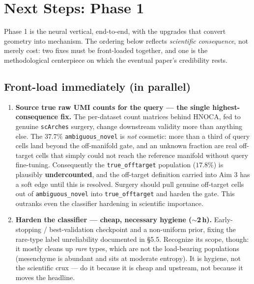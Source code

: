 \documentclass[11pt]{article}
\begin{document}
\section{Next Steps: Phase 1}
Phase 1 is the neural vertical, end-to-end, with the upgrades that convert geometry into mechanism. The ordering below reflects \emph{scientific consequence}, not merely cost: two fixes must be front-loaded together, and one is the methodological centerpiece on which the eventual paper's credibility rests.

\subsection*{Front-load immediately (in parallel)}
\begin{enumerate}[label=\textbf{\arabic*.}]
\item \textbf{Source true raw UMI counts for the query --- the single highest-consequence fix.} The per-dataset count matrices behind HNOCA, fed to genuine \texttt{scArches} surgery, change downstream validity more than anything else. The $37.7\%$ \texttt{ambiguous\_novel} is \emph{not} cosmetic: more than a third of query cells land beyond the off-manifold gate, and an unknown fraction are real off-target cells that simply could not reach the reference manifold without query fine-tuning. Consequently the \texttt{true\_offtarget} population ($17.8\%$) is plausibly \textbf{undercounted}, and the off-target definition carried into Aim 3 has a soft edge until this is resolved. Surgery should pull genuine off-target cells out of \texttt{ambiguous\_novel} into \texttt{true\_offtarget} and harden the gate. This outranks even the classifier hardening in scientific importance.
\item \textbf{Harden the classifier --- cheap, necessary hygiene ($\sim$2\,h).} Early-stopping / best-validation checkpoint and a non-uniform prior, fixing the rare-type label unreliability documented in \S5.5. Recognize its scope, though: it mostly cleans up \emph{rare} types, which are not the load-bearing populations (mesenchyme is abundant and sits at moderate entropy). It is hygiene, not the scientific crux --- do it because it is cheap and upstream, not because it moves the headline.
\end{enumerate}
\end{document}
